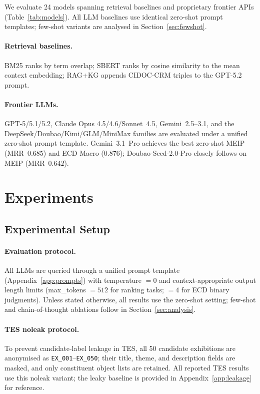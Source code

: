 \documentclass[11pt]{article}
\newcommand{\tes}{\textsc{TES}}
\begin{document}
We evaluate 24 models spanning retrieval baselines and proprietary frontier APIs
(Table~\ref{tab:models}).
All LLM baselines use identical zero-shot prompt templates;
few-shot variants are analysed in Section~\ref{sec:fewshot}.


\paragraph{Retrieval baselines.}
BM25 \citep{robertson1994okapi} ranks by term overlap;
SBERT ranks by cosine similarity to the mean context embedding;
RAG+KG appends CIDOC-CRM triples to the GPT-5.2 prompt.

\paragraph{Frontier LLMs.}
GPT-5/5.1/5.2, Claude Opus 4.5/4.6/Sonnet~4.5, Gemini~2.5--3.1, and
the DeepSeek/Doubao/Kimi/GLM/MiniMax families are evaluated under a
unified zero-shot prompt template.
Gemini~3.1~Pro achieves the best zero-shot MEIP (MRR~$0.685$) and ECD Macro ($0.876$);
Doubao-Seed-2.0-Pro closely follows on MEIP (MRR~$0.642$).

\section{Experiments}
\label{sec:experiments}

\subsection{Experimental Setup}
\label{sec:setup}

\paragraph{Evaluation protocol.}
All LLMs are queried through a unified prompt template (Appendix~\ref{app:prompts})
with temperature $= 0$ and context-appropriate output length limits
(max\_tokens $= 512$ for ranking tasks; $= 4$ for ECD binary judgments).
Unless stated otherwise, all results use the zero-shot setting;
few-shot and chain-of-thought ablations follow in Section~\ref{sec:analysis}.

\paragraph{TES noleak protocol.}
To prevent candidate-label leakage in \tes{}, all 50 candidate exhibitions
are anonymised as \texttt{EX\_001}--\texttt{EX\_050}; their title, theme,
and description fields are masked, and only constituent object lists are
retained.
All reported TES results use this noleak variant;
the leaky baseline is provided in Appendix~\ref{app:leakage} for reference.
\end{document}
